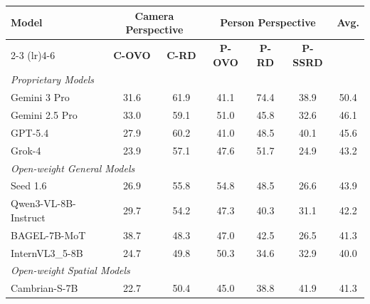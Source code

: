 \documentclass{llmxive}
\providecommand{\cone}[1]{\cellcolor{top1color}\textbf{#1}}
\providecommand{\ctwo}[1]{\cellcolor{top2color}#1}
\providecommand{\cthree}[1]{\cellcolor{top3color}#1}
\begin{document}
\begin{table}[t]
    \centering
    \scriptsize
    \setlength{\tabcolsep}{3pt}
 
    \label{tab:viewspatial_zeroshot}
    \begin{tabular}{lcc|ccc|c}
        \toprule
        \multirow{2}{*}{\textbf{Model}} & \multicolumn{2}{c}{\textbf{Camera Perspective}} & \multicolumn{3}{c}{\textbf{Person Perspective}} & \multirow{2}{*}{\textbf{Avg.}} \\
        \cmidrule(lr){2-3} \cmidrule(lr){4-6}
        & \textbf{C-OVO} & \textbf{C-RD} & \textbf{P-OVO} & \textbf{P-RD} & \textbf{P-SSRD} & \\
        \midrule
        \multicolumn{7}{l}{\textit{Proprietary Models}} \\
        Gemini 3 Pro & 31.6 & \ctwo{61.9} & 41.1 & \ctwo{74.4} & 38.9 & 50.4 \\
        Gemini 2.5 Pro & 33.0 & 59.1 & 51.0 & 45.8 & 32.6 & 46.1 \\
        GPT-5.4 & 27.9 & 60.2 & 41.0 & 48.5 & 40.1 & 45.6 \\
        Grok-4 & 23.9 & 57.1 & 47.6 & 51.7 & 24.9 & 43.2 \\
        \midrule
        \multicolumn{7}{l}{\textit{Open-weight General Models}} \\
        Seed 1.6 & 26.9 & 55.8 & 54.8 & 48.5 & 26.6 & 43.9 \\
        Qwen3-VL-8B-Instruct & 29.7 & 54.2 & 47.3 & 40.3 & 31.1 & 42.2 \\
        BAGEL-7B-MoT & \ctwo{38.7} & 48.3 & 47.0 & 42.5 & 26.5 & 41.3 \\
        InternVL3\_5-8B & 24.7 & 49.8 & 50.3 & 34.6 & 32.9 & 40.0 \\
        \midrule
        \multicolumn{7}{l}{\textit{Open-weight Spatial Models}} \\
        Cambrian-S-7B & 22.7 & 50.4 & 45.0 & 38.8 & 41.9 & 41.3 \\

\end{tabular}
\end{table}
\end{document}
